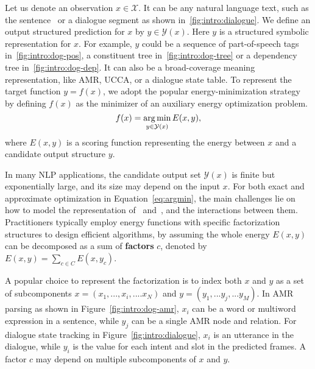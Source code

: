 Let us denote an observation $x \in \mathcal{X}$. It can be any natural
language text, such as the sentence~ or a dialogue segment as shown
in~\autoref{fig:intro:dialogue}. We define an output structured
prediction for $x$ by $y \in \mathcal{Y}(x)$. Here $y$ is a structured
symbolic representation for $x$. For example, $y$ could be a sequence
of part-of-speech tags in~\autoref{fig:intro:dog-pos}, a constituent
tree in~\autoref{fig:intro:dog-tree} or a dependency tree
in~\autoref{fig:intro:dog-dep}. It can also be a broad-coverage
meaning representation, like AMR, UCCA, or a dialogue state table. To
represent the target function $y=f(x)$, we adopt the popular
energy-minimization strategy by defining $f(x)$ as the minimizer of an
auxiliary energy optimization problem.
\begin{equation}
\label{eq:argmin}
f(x) = \operatorname*{arg\,min}_{y \in \mathcal{Y}(x)} E(x, y),
\end{equation}
where $E(x,y)$ is a scoring function representing the energy between
$x$ and a candidate output structure $y$.

In many NLP applications, the candidate output set $\mathcal{Y}(x)$ is
finite but exponentially large, and its size may depend on the input
$x$. For both exact and approximate optimization in
Equation~\ref{eq:argmin}, the main challenges lie on how to model the
representation of \IN~and~\OUT, and the interactions between
them. Practitioners typically employ energy functions with specific
factorization structures to design efficient algorithms, by assuming
the whole energy $E(x, y)$ can be decomposed as a sum of
\textbf{factors} $c$, denoted by $E(x, y) =\sum_{c \in C} E(x, y_{c})$.

A popular choice to represent the factorization is to index both $x$
and $y$ as a set of subcomponents $x=(x_{1},..., x_{i},.... x_{N})$
and $y=(y_{1},...y_{j},...y_{M})$. In AMR parsing as shown in
Figure~\ref{fig:intro:dog-amr}, $x_{i}$ can be a word or multiword
expression in a sentence, while $y_{j}$ can be a single AMR node and
relation.  For dialogue state tracking in
Figure~\ref{fig:intro:dialogue}, $x_{i}$ is an utterance in the
dialogue, while $y_{i}$ is the value for each intent and slot in the
predicted frames. A factor $c$ may depend on multiple subcomponents
of $x$ and $y$.

